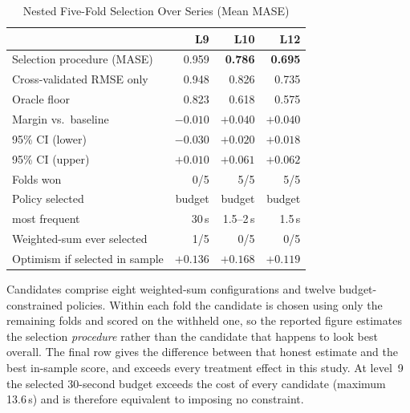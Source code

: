 \begin{table}[!t]
\caption{Nested Five-Fold Selection Over Series (Mean MASE)}
\label{tab:config-selection}
\centering
\begin{tabular}{@{}lrrr@{}}
\toprule
 & \textbf{L9} & \textbf{L10} & \textbf{L12} \\
\midrule
Selection procedure (MASE)   & 0.959 & \textbf{0.786} & \textbf{0.695} \\
Cross-validated RMSE only    & 0.948 & 0.826 & 0.735 \\
Oracle floor                 & 0.823 & 0.618 & 0.575 \\
\midrule
Margin vs.\ baseline         & $-0.010$ & $+0.040$ & $+0.040$ \\
95\% CI (lower)              & $-0.030$ & $+0.020$ & $+0.018$ \\
95\% CI (upper)              & $+0.010$ & $+0.061$ & $+0.062$ \\
Folds won                    & 0/5 & 5/5 & 5/5 \\
\midrule
Policy selected              & budget & budget & budget \\
\quad most frequent          & 30\,s & 1.5--2\,s & 1.5\,s \\
Weighted-sum ever selected   & 1/5 & 0/5 & 0/5 \\
\midrule
Optimism if selected in sample & $+0.136$ & $+0.168$ & $+0.119$ \\
\bottomrule
\end{tabular}
\vspace{2pt}
\begin{minipage}{\columnwidth}
\footnotesize
Candidates comprise eight weighted-sum configurations and twelve budget-constrained
policies. Within each fold the candidate is chosen using only the remaining folds
and scored on the withheld one, so the reported figure estimates the selection
\emph{procedure} rather than the candidate that happens to look best overall. The
final row gives the difference between that honest estimate and the best in-sample
score, and exceeds every treatment effect in this study. At level~9 the selected
30-second budget exceeds the cost of every candidate (maximum 13.6\,s) and is
therefore equivalent to imposing no constraint.
\end{minipage}
\end{table}
